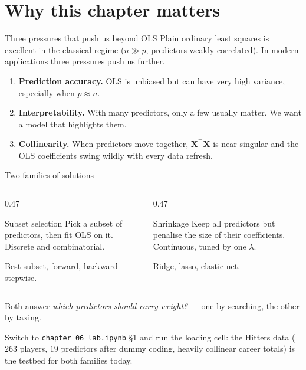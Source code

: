 \documentclass[aspectratio=169,11pt]{beamer}
\begin{document}
\section{Why this chapter matters}

\begin{frame}{Three pressures that push us beyond OLS}
  Plain ordinary least squares is excellent in the classical regime
  ($n \gg p$, predictors weakly correlated). In modern applications
  three pressures push us further.
  \begin{takeaway}
    \begin{enumerate}
      \item \textbf{Prediction accuracy.} OLS is unbiased but can have
            very high variance, especially when $p \approx n$.
      \item \textbf{Interpretability.} With many predictors, only a
            few usually matter. We want a model that highlights them.
      \item \textbf{Collinearity.} When predictors move together,
            $\mathbf{X}^\top\mathbf{X}$ is near-singular and the OLS
            coefficients swing wildly with every data refresh.
    \end{enumerate}
  \end{takeaway}
\end{frame}

\begin{frame}{Two families of solutions}
  \begin{columns}[T]
    \begin{column}{0.47\textwidth}
      \begin{block}{Subset selection}
        Pick a subset of predictors, then fit OLS on it. Discrete and
        combinatorial.
      \end{block}
      Best subset, forward, backward stepwise.
    \end{column}
    \begin{column}{0.47\textwidth}
      \begin{block}{Shrinkage}
        Keep all predictors but penalise the size of their
        coefficients. Continuous, tuned by one $\lambda$.
      \end{block}
      Ridge, lasso, elastic net.
    \end{column}
  \end{columns}
  \begin{takeaway}
    Both answer \emph{which predictors should carry weight?} --- one by
    searching, the other by taxing.
  \end{takeaway}
  \begin{labnote}
    Switch to \texttt{chapter\_06\_lab.ipynb} \S1 and run the loading cell: the
    Hitters data ($263$ players, $19$ predictors after dummy coding, heavily
    collinear career totals) is the testbed for both families today.
  \end{labnote}
\end{frame}
\end{document}
